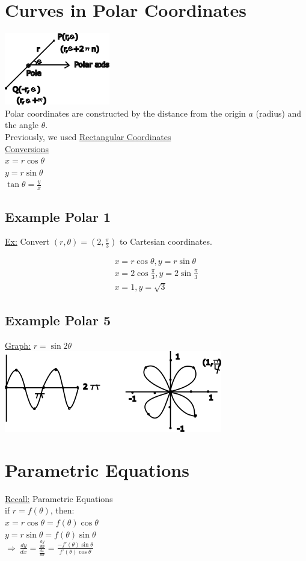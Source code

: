 \documentclass[12pt]{article}
\begin{document}
\section{Curves in Polar Coordinates}
\includegraphics{polarcoordinates}\\%
Polar coordinates are constructed by the distance from the origin $a$ (radius) and the angle $\theta$.\\%
Previously, we used \underline{Rectangular Coordinates}\\%
\underline{Conversions}\\%
$x=r\cos\theta$\\%
$y=r\sin\theta$\\%
$\tan\theta=\frac{y}{x}$

\subsection{Example Polar 1}
\underline{Ex:} Convert $(r,\theta)=(2,\frac{\pi}{3})$ to Cartesian coordinates.

\begin{align}
	x=r \cos\theta, y=r \sin\theta\\%
	x=2 \cos \frac{\pi}{3}, y=2 \sin \frac{\pi}{3}\\%
	x=1, y=\sqrt{3}
\end{align}

\subsection{Example Polar 5}
\underline{Graph:} $r=\sin2\theta$\\%
\includegraphics{flowerpolar}

\section{Parametric Equations}
\underline{Recall:} Parametric Equations\\%
if $r=f(\theta)$, then:\\%
$x=r\cos\theta = f(\theta)\cos\theta$\\%
$y=r\sin\theta=f(\theta)\sin\theta$\\%
$\Rightarrow\ \frac{dy}{dx}=\frac{\frac{dy}{d\theta}}{\frac{dx}{d\theta}}= \frac{-f'(\theta)\sin\theta}{f'(\theta)\cos\theta}$
\end{document}
